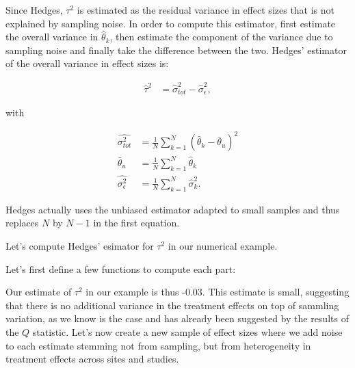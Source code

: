 \documentclass[]{book}
\newenvironment{Shaded}{\begin{snugshade}}{\end{snugshade}}
\newcommand{\ControlFlowTok}[1]{\textcolor[rgb]{0.13,0.29,0.53}{\textbf{#1}}}
\newcommand{\DecValTok}[1]{\textcolor[rgb]{0.00,0.00,0.81}{#1}}
\newcommand{\FloatTok}[1]{\textcolor[rgb]{0.00,0.00,0.81}{#1}}
\newcommand{\KeywordTok}[1]{\textcolor[rgb]{0.13,0.29,0.53}{\textbf{#1}}}
\newcommand{\NormalTok}[1]{#1}
\newcommand{\OperatorTok}[1]{\textcolor[rgb]{0.81,0.36,0.00}{\textbf{#1}}}
\newcommand{\StringTok}[1]{\textcolor[rgb]{0.31,0.60,0.02}{#1}}
\theoremstyle{definition}
\theoremstyle{definition}
\theoremstyle{definition}
\theoremstyle{remark}
\let\BeginKnitrBlock\begin \let\EndKnitrBlock\end
\begin{document}
Since Hedges, \(\tau^2\) is estimated as the residual variance in effect sizes that is not explained by sampling noise.
In order to compute this estimator, first estimate the overall variance in \(\hat{\theta}_k\), then estimate the component of the variance due to sampling noise and finally take the difference between the two.
Hedges' estimator of the overall variance in effect sizes is:

\begin{align*}
\hat{\tau}^2 & = \hat{\sigma}^2_{tot}-\hat{\sigma}^2_{\epsilon},
\end{align*}

with

\begin{align*}
\hat{\sigma^2_{tot}} & = \frac{1}{N}\sum_{k=1}^N(\hat{\theta}_k-\bar{\theta}_u)^2\\
\bar{\theta}_u & = \frac{1}{N}\sum_{k=1}^N\hat{\theta}_k \\
\hat{\sigma^2_{\epsilon}} & = \frac{1}{N}\sum_{k=1}^N\hat{\sigma}_k^2.
\end{align*}

\BeginKnitrBlock{remark}
\iffalse{} {Remark. } \fi{}Hedges actually uses the unbiased estimator adapted to small samples and thus replaces \(N\) by \(N-1\) in the first equation.
\EndKnitrBlock{remark}

\BeginKnitrBlock{example}
\protect\hypertarget{exm:unnamed-chunk-151}{}{\label{exm:unnamed-chunk-151} }Let's compute Hedges' esimator for \(\tau^2\) in our numerical example.
\EndKnitrBlock{example}

Let's first define a few functions to compute each part:

\begin{Shaded}
\end{Shaded}

Our estimate of \(\tau^2\) in our example is thus -0.03.
This estimate is small, suggesting that there is no additional variance in the treatment effects on top of sammling variation, as we know is the case and has already been suggested by the results of the \(Q\) statistic.
Let's now create a new sample of effect sizes where we add noise to each estimate stemming not from sampling, but from heterogeneity in treatment effects across sites and studies.
\end{document}
